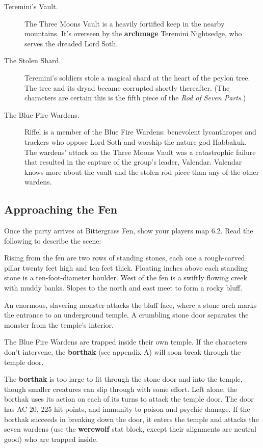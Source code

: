 \documentclass[10pt,a4paper,twoside,bg=print,twocolumn,openany,nodeprecatedcode]{dndbook}
\begin{document}
\begin{description}
\item[Teremini's Vault.]
The Three Moons Vault is a heavily fortified keep in the nearby mountains. It's overseen by the \textbf{archmage} Teremini Nightsedge, who serves the dreaded Lord Soth.
\item[The Stolen Shard.]
Teremini's soldiers stole a magical shard at the heart of the peylon tree. The tree and its dryad became corrupted shortly thereafter. (The characters are certain this is the fifth piece of the \textit{Rod of Seven Parts}.)
\item[The Blue Fire Wardens.]
Riffel is a member of the Blue Fire Wardens: benevolent lycanthropes and trackers who oppose Lord Soth and worship the nature god Habbakuk. The wardens' attack on the Three Moons Vault was a catastrophic failure that resulted in the capture of the group's leader, Valendar. Valendar knows more about the vault and the stolen rod piece than any of the other wardens.
\end{description}

\subsection{Approaching the Fen}
Once the party arrives at Bittergrass Fen, show your players map 6.2. Read the following to describe the scene:

\begin{DndReadAloud}{}
Rising from the fen are two rows of standing stones, each one a rough-carved pillar twenty feet high and ten feet thick. Floating inches above each standing stone is a ten-foot-diameter boulder. West of the fen is a swiftly flowing creek with muddy banks. Slopes to the north and east meet to form a rocky bluff.

An enormous, slavering monster attacks the bluff face, where a stone arch marks the entrance to an underground temple. A crumbling stone door separates the monster from the temple's interior.

\end{DndReadAloud}

The Blue Fire Wardens are trapped inside their own temple. If the characters don't intervene, the \textbf{borthak} (see appendix A) will soon break through the temple door.

The \textbf{borthak} is too large to fit through the stone door and into the temple, though smaller creatures can slip through with some effort. Left alone, the borthak uses its action on each of its turns to attack the temple door. The door has AC 20, 225 hit points, and immunity to poison and psychic damage. If the borthak succeeds in breaking down the door, it enters the temple and attacks the seven wardens (use the \textbf{werewolf} stat block, except their alignments are neutral good) who are trapped inside.
\end{document}
